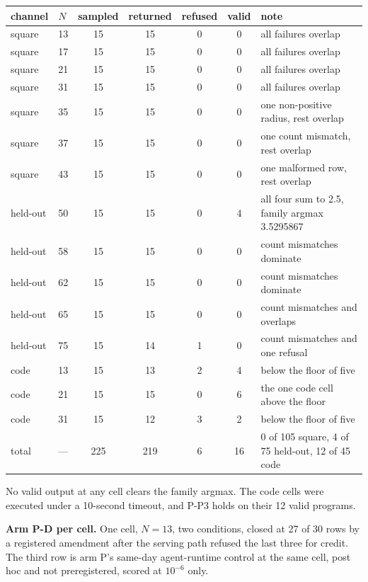 \begin{center}
\begin{small}
\begin{tabular}{@{}llccccl@{}}
\toprule
channel & $N$ & sampled & returned & refused & valid & note \\
\midrule
square & 13 & 15 & 15 & 0 & 0 & all failures overlap \\
square & 17 & 15 & 15 & 0 & 0 & all failures overlap \\
square & 21 & 15 & 15 & 0 & 0 & all failures overlap \\
square & 31 & 15 & 15 & 0 & 0 & all failures overlap \\
square & 35 & 15 & 15 & 0 & 0 & one non-positive radius, rest overlap \\
square & 37 & 15 & 15 & 0 & 0 & one count mismatch, rest overlap \\
square & 43 & 15 & 15 & 0 & 0 & one malformed row, rest overlap \\
held-out & 50 & 15 & 15 & 0 & 4 & all four sum to 2.5, family argmax 3.5295867 \\
held-out & 58 & 15 & 15 & 0 & 0 & count mismatches dominate \\
held-out & 62 & 15 & 15 & 0 & 0 & count mismatches dominate \\
held-out & 65 & 15 & 15 & 0 & 0 & count mismatches and overlaps \\
held-out & 75 & 15 & 14 & 1 & 0 & count mismatches and one refusal \\
code & 13 & 15 & 13 & 2 & 4 & below the floor of five \\
code & 21 & 15 & 15 & 0 & 6 & the one code cell above the floor \\
code & 31 & 15 & 12 & 3 & 2 & below the floor of five \\
\midrule
total & --- & 225 & 219 & 6 & 16 & 0 of 105 square, 4 of 75 held-out, 12 of 45 code \\
\bottomrule
\end{tabular}
\end{small}
\end{center}

No valid output at any cell clears the family argmax. The code cells were executed under a
10-second timeout, and P-P3 holds on their 12 valid programs.

\textbf{Arm P-D per cell.} One cell, $N = 13$, two conditions, closed at 27 of 30 rows by a
registered amendment after the serving path refused the last three for credit. The third row
is arm P's same-day agent-runtime control at the same cell, post hoc and not preregistered,
scored at $10^{-6}$ only.

